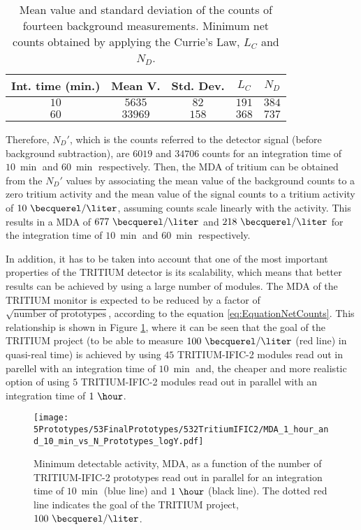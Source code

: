 \begin{table}[htbp]
\centering{}%
\begin{tabular}{ccccc}
\toprule 
Int. time (min.) & Mean V. & Std. Dev. & $L_C$ & $N_D$ \tabularnewline
\midrule
\midrule 
$10$ & $5635$ & $82$ & $191$ & $384$ \tabularnewline
$60$ & $33969$ & $158$ & $368$ & $737$ \tabularnewline
\bottomrule
\end{tabular}
\caption{Mean value and standard deviation of the counts of fourteen background measurements. Minimum net counts obtained by applying the Currie's Law, $L_C$ and $N_D$.}
\label{tab:CurrieLawTRITIUMIFIC2}
\end{table}

Therefore, $N_D'$, which is the counts referred to the detector signal (before background subtraction), are $6019$ and $34706$ counts for an integration time of $10~\min$ and $60~\min$ respectively. Then, the MDA of tritium can be obtained from the $N_D'$ values by associating the mean value of the background counts to a zero tritium activity and the mean value of the signal counts to a tritium activity of $10~\becquerel/\liter$, assuming counts scale linearly with the activity. This results in a MDA of $677~\becquerel/\liter$ and $218~\becquerel/\liter$ for the integration time of $10~\min$ and $60~\min$ respectively. 

In addition, it has to be taken into account that one of the most important properties of the TRITIUM detector is its scalability, which means that better results can be achieved by using a large number of modules. The MDA of the TRITIUM monitor is expected to be reduced by a factor of $\sqrt{\text{number of prototypes}}$, according to the equation \ref{eq:EquationNetCounts}. This relationship is shown in Figure \ref{fig:MDATRITIUMmonitor}, where it can be seen that the goal of the TRITIUM project (to be able to measure $100~\becquerel/\liter$ (red line) in quasi-real time) is achieved by using $45$ TRITIUM-IFIC-2 modules read out in parellel with an integration time of $10~\min$ and, the cheaper and more realistic option of using $5$ TRITIUM-IFIC-2 modules read out in parallel with an integration time of $1~\hour$. %

\begin{figure}[h]
\centering
\texttt{[image: 5Prototypes/53FinalPrototypes/532TritiumIFIC2/MDA\_1\_hour\_and\_10\_min\_vs\_N\_Prototypes\_logY.pdf]}
\caption{Minimum detectable activity, MDA, as a function of the number of TRITIUM-IFIC-2 prototypes read out in parallel for an integration time of $10~\min$ (blue line) and $1~\hour$ (black line). The dotted red line indicates the goal of the TRITIUM project, $100~\becquerel/\liter$. \label{fig:MDATRITIUMmonitor}}
\end{figure}


